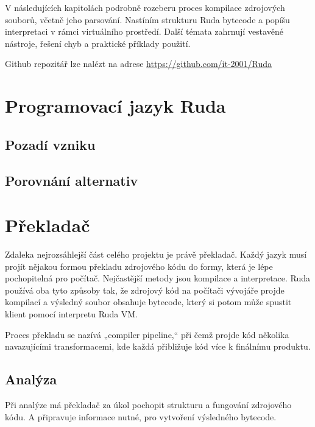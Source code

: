 \documentclass[12pt, a4paper,
twoside,        %
openright
]{report}
\let\oldchapter\chapter
\renewcommand{\chapter}{
	\clearpage
	\pagestyle{fancy}
	\oldchapter
}
\begin{document}
\noindent 
V následujících kapitolách podrobně rozeberu proces kompilace zdrojových souborů, včetně jeho parsování. Nastíním strukturu Ruda bytecode a popíšu interpretaci v rámci virtuálního prostředí. Další témata zahrnují vestavěné nástroje, řešení chyb a praktické příklady použití.

Github repozitář lze nalézt na adrese \url{https://github.com/it-2001/Ruda}



\chapter{Programovací jazyk Ruda}

\section{Pozadí vzniku}

\section{Porovnání alternativ}

\chapter{Překladač}

Zdaleka nejrozsáhlejší část celého projektu je právě překladač. Každý jazyk musí projít nějakou formou překladu zdrojového kódu do formy, která je lépe pochopitelná pro počítač. Nejčastější metody jsou kompilace a interpretace. Ruda používá oba tyto způsoby tak, že zdrojový kód na počítači vývojáře projde kompilací a výsledný soubor obsahuje bytecode, který si potom může spustit klient pomocí interpretu Ruda VM.

Proces překladu se nazívá „compiler pipeline,“ při čemž projde kód několika navazujícími transformacemi, kde každá přibližuje kód více k finálnímu produktu.

\section{Analýza}

Při analýze má překladač za úkol pochopit strukturu a fungování zdrojového kódu. A připravuje informace nutné, pro vytvoření výsledného bytecode.
\end{document}
